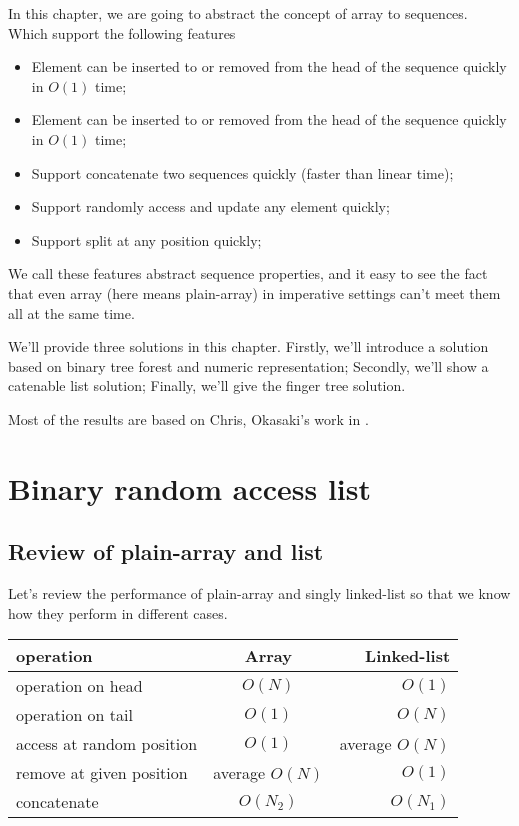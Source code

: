 \documentclass{article}
\begin{document}
In this chapter, we are going to abstract the concept of array to sequences.
Which support the following features

\begin{itemize}
\item Element can be inserted to or removed from the head of the sequence quickly in $O(1)$ time;
\item Element can be inserted to or removed from the head of the sequence quickly in $O(1)$ time;
\item Support concatenate two sequences quickly (faster than linear time);
\item Support randomly access and update any element quickly;
\item Support split at any position quickly;
\end{itemize}

We call these features abstract sequence properties, and it easy to see
the fact that even array (here means plain-array) in imperative settings
can't meet them all at the same time.

We'll provide three solutions in this chapter. Firstly, we'll introduce
a solution based on binary tree forest and numeric representation;
Secondly, we'll show a catenable list solution; Finally, we'll give
the finger tree solution.

Most of the results are based on Chris, Okasaki's work in \cite{okasaki-book}. 

\section{Binary random access list}

\subsection{Review of plain-array and list}

Let's review the performance of plain-array and singly linked-list so that we know
how they perform in different cases.

\begin{tabular}{l | c | r}
  \hline
  operation & Array & Linked-list \\
  \hline
  operation on head & $O(N)$ & $O(1)$ \\
  operation on tail & $O(1)$ & $O(N)$ \\
  access at random position & $O(1)$ & average $O(N)$ \\
  remove at given position & average $O(N)$ & $O(1)$ \\
  concatenate & $O(N_2)$ & $O(N_1)$ \\
  \hline
\end{tabular}
\end{document}
